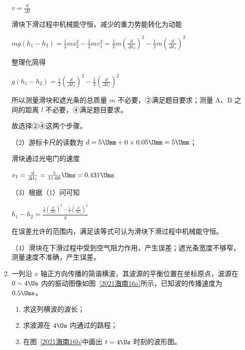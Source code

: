 \documentclass[\gkver]{gaokaozhenti}
\begin{document}
\begin{enumerate}
{	$v = \frac{d}{\Delta t}$

	滑块下滑过程中机械能守恒，减少的重力势能转化为动能

	$mg(h_{1} - h_{2}) = \frac{1}{2}mv_{2}^{2} - \frac{1}{2}mv_{1}^{2} = \frac{1}{2}m\left(\frac{d}{\Delta t_{2}}\right)^{2} - \frac{1}{2}m\left(\frac{d}{\Delta t_{1}}\right)^{2}$

	整理化简得

	$g(h_{1} - h_{2}) = \frac{1}{2}\left(\frac{d}{\Delta t_{2}}\right)^{2} - \frac{1}{2}\left(\frac{d}{\Delta t_{1}}\right)^{2}$

	所以测量滑块和遮光条的总质量 $m$ 不必要，②满足题目要求；测量 A、B 之间的距离 $l$ 不必要，④满足题目要求。

	故选择②④这两个步骤。

	（2）游标卡尺的读数为 $d = 5\Umm + 0 \times 0.05\Umm = 5\Umm$；

	滑块通过光电门的速度

	$v_{1} = \frac{d}{\Delta t_{1}} = \frac{5}{11.60}\Ums = 0.431\Ums$

	（3）根据（1）问可知

	$h_{1} - h_{2} = \frac{\frac{1}{2}\left(\frac{d}{\Delta t_{2}}\right)^{2} - \frac{1}{2}\left(\frac{d}{\Delta t_{1}}\right)^{2}}{g}$

	在误差允许的范围内，满足该等式可认为滑块下滑过程中机械能守恒。

	（4）滑块在下滑过程中受到空气阻力作用，产生误差；遮光条宽度不够窄，测量速度不准确，产生误差。
}

\item
一列沿 $x$ 轴正方向传播的简谐横波，其波源的平衡位置在坐标原点，波源在 $0 \sim 4\Us$ 内的振动图像如图~\ref{2021海南16a}所示，已知波的传播速度为 $0.5\Ums$。

\begin{enumerate}
	\item
	求这列横波的波长；
	\item
	求波源在 $4\Us$ 内通过的路程；
	\item
	在图~\ref{2021海南16b}中画出 $t = 4\Us$ 时刻的波形图。
\end{enumerate}


\jdanswer{
\begin{enumerate}
	\item
	$\lambda = 2\Um$


\end{enumerate}}
\end{enumerate}
\end{document}
